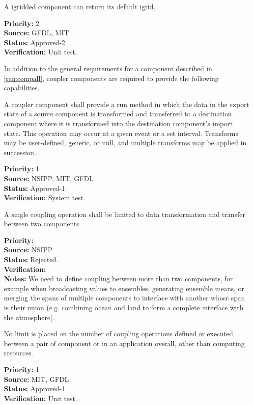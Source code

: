A igridded component can return its default igrid.
\begin{reqlist}
{\bf Priority:} 2\\
{\bf Source:} GFDL, MIT\\
{\bf Status:} Approved-2.\\
{\bf Verification:} Unit test.
\end{reqlist}


In addition to the general requirements for a component described in 
\ref{req:compall}, coupler components are required to provide the
following capabilities.

A coupler component shall provide a run method in which the data in the
export state of a source component is transformed and 
transferred to a destination component where it is transformed 
into the destination component's import state.  This operation 
may occur at a given event or a set interval.  Transforms may be 
user-defined, generic, or null, and multiple transforms may be applied 
in succession.
\begin{reqlist}
{\bf Priority:} 1\\ 
{\bf Source:} NSIPP, MIT, GFDL \\
{\bf Status:} Approved-1.\\
{\bf Verification:} System test.
\end{reqlist}

A single coupling operation shall be limited to data transformation and
transfer between two components.
\begin{reqlist}
{\bf Priority:} \\ 
{\bf Source:} NSIPP \\
{\bf Status:} Rejected.\\
{\bf Verification:} \\
{\bf Notes:} We need to define coupling between more than two 
components, for example when broadcasting values to ensembles,
generating ensemble means, or merging the spans of multiple components
to interface with another whose span is their union (e.g. 
combining ocean and land to form a complete interface with the 
atmosphere).
\end{reqlist}

No limit is placed on the number of coupling operations defined or
executed between a pair of component or in an application overall, 
other than computing resources.
\begin{reqlist}
{\bf Priority:} 1\\ 
{\bf Source:} MIT, GFDL \\
{\bf Status:} Approved-1.\\
{\bf Verification:} Unit test.\\
\end{reqlist}

